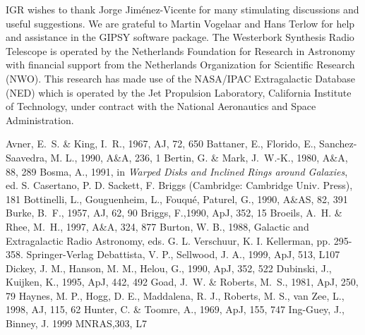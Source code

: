 \documentclass{aa}
\begin{document}
IGR wishes to thank Jorge Jim\'enez-Vicente for many stimulating
discussions and useful suggestions. We are grateful to Martin Vogelaar
and Hans Terlow for help and assistance in the GIPSY software package.
The Westerbork Synthesis Radio Telescope is operated by the
Netherlands Foundation for Research in Astronomy with financial
support from the Netherlands Organization for Scientific Research
(NWO). This research has made use of the
NASA/IPAC Extragalactic Database (NED) which is operated by the Jet
Propulsion Laboratory, California Institute of Technology, under contract with
the National Aeronautics and Space Administration. 

\newcommand{\apj}{ApJ}
\newcommand{\mnras}{MNRAS}

\begin{thebibliography}{}
{Avner}, E.~S. \& {King}, I.~R., 1967, AJ, 72, 650
Battaner, E., Florido, E., Sanchez-Saavedra, M. L., 1990, A\&A, 236, 1
{Bertin}, G. \& {Mark}, J.~W.-K., 1980, A\&A, 88, 289
Bosma, A., 1991, in {\it Warped Disks and Inclined Rings around Galaxies},
ed. S. Casertano, P. D. Sackett, F. Briggs (Cambridge: Cambridge
Univ. Press), 181
Bottinelli, L., Gouguenheim, L., Fouqu\'e, Paturel, G., 1990, A\&AS, 82, 391
Burke, B.~F., 1957, AJ, 62, 90
Briggs, F.,1990, ApJ, 352, 15
Broeils, A.~H. \& Rhee, M.~H., 1997, A\&A, 324, 877
Burton, W. B., 1988, Galactic and Extragalactic Radio Astronomy, eds.
G. L. Verschuur, K. I. Kellerman, pp. 295-358. Springer-Verlag
Debattista, V. P., Sellwood, J. A., 1999, ApJ, 513, L107
Dickey, J. M., Hanson, M. M., Helou, G., 1990, \apj, 352, 522
Dubinski, J., Kuijken, K., 1995, ApJ, 442, 492 
{Goad}, J.~W. \& {Roberts}, M.~S., 1981, \apj, 250, 79
Haynes, M. P., Hogg, D. E., Maddalena, R. J., Roberts, M. S., van Zee,
L., 1998, AJ, 115, 62 
Hunter, C. \& Toomre, A., 1969, ApJ, 155, 747
Ing-Guey, J., Binney, J. 1999 MNRAS,303, L7

\end{thebibliography}
\end{document}
